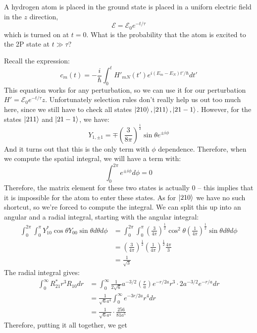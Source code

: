 \documentclass[10pt]{article}
\begin{document}
	A hydrogen atom is placed in the ground state is placed in a uniforn electric field in the $z$ direction, 
	\[ \mathcal E = \mathcal E_0e^{-t/\tau}\]
	which is turned on at $t = 0$. What is the probability that the atom is excited to the 2P state at $t \gg 
	\tau$?

	\begin{solution}
		Recall the expression: 
		\[
			c_m(t) = -\frac{i}{\hbar}\int_0^t H'_{mN}(t') e^{i(E_m - E_N)t'/\hbar} dt'
		\] 
		This equation works for any perturbation, so we can use it for our perturbation $H' = \mathcal E_0 
		e^{-t/\tau} z$. Unfortunately selection rules don't really help us out too much here, since we still
		have to check all states $\ket{210}, \ket{211}, \ket{21-1}$. However, for the states $\ket{211}$ and
		$\ket{21-1}$, we have:
		\[
			Y_{1, \pm 1} = \mp \left(  \frac{3}{8\pi}\right)^{\frac{1}{2}} \sin \theta e^{\pm i\phi}
		\] 
		And it turns out that this is the only term with $\phi$ dependence. Therefore, when we compute the 
		spatial integral, we will have a term with: 
		\[
			\int_0^{2\pi} e^{\pm i\phi} d\phi = 0
		\] 
		Therefore, the matrix element for these two states is actually 0 -- this implies that it is impossible
		for the atom to enter these states. As for $\ket{210}$ we have no such shortcut, so we're forced to 
		compute the integral. We can split this up into an angular and a radial integral, starting with 
		the angular integral:
		\begin{align*}
			\int_0^{2\pi}\int_0^\pi Y_{10}^* \cos \theta Y_{00} \sin \theta d\theta d\phi
			&= \int_0^{2\pi}
			\int_0^\pi \left( \frac{3}{4\pi} \right)^{\frac{1}{2}}\cos^2 \theta 
			\left( \frac{1}{4\pi} \right)^{\frac{1}{2}} \sin \theta d\theta d\phi  \\
			&= \left( \frac{3}{4\pi} \right) ^{\frac{1}{2}}\left( \frac{1}{4\pi} \right) ^{\frac{1}{2}} 
			\frac{4\pi}{3} \\
			&= \frac{1}{\sqrt{3} }
		\end{align*}
		The radial integral gives:
		\begin{align*}
			\int_0^\infty R_{21}^* r^3 R_{10} dr &= \int_0^\infty \frac{1}{2\sqrt{6} }a^{-3/2} 
			\left( \frac{r}{a} \right) e^{-r/2a} r^3 \cdot 2a^{-3/2} e^{-r/a} dr\\
												 &= \frac{1}{\sqrt{6} a^4}\int_0^\infty e^{-3r/2a} r^4 dr\\
												 &= \frac{1}{\sqrt{6} a^4}\cdot \frac{256}{81a^5}
		\end{align*}
		Therefore, putting it all together, we get 
		\[
\]
\end{solution}
\end{document}
